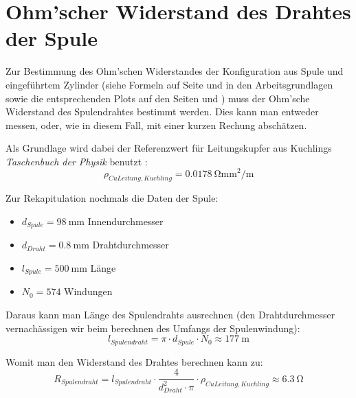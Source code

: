 \clearpage
\section{Ohm'scher Widerstand des Drahtes der Spule}
\label{app:R_Ohm_0}

Zur   Bestimmung   des   Ohm'schen    Widerstandes   der   Konfiguration   aus
Spule    und    eingef\"uhrtem    Zylinder   (siehe    Formeln    auf    Seite
\pageref{eq:hohlzylinder:LRExact}     und     \pageref{eq:vollzylinder:RExact}
in     den     Arbeitsgrundlagen     sowie    die     entsprechenden     Plots
auf     den     Seiten    \pageref{sec:ausw:subsec:vollz:subsubsec:LR}     und
\pageref{sec:ausw:subsec:hohlz:st:subsubsec:LR}) muss der  Ohm'sche Widerstand
des Spulendrahtes bestimmt werden. Dies kann man entweder messen, oder, wie in
diesem Fall, mit einer kurzen Rechung absch\"atzen.

Als Grundlage wird  dabei der Referenzwert f\"ur  Leitungskupfer aus Kuchlings
\emph{Taschenbuch der Physik} benutzt \cite{ref:kuchling:resistivityTable}:
\begin{equation*}
    \rho_{CuLeitung,Kuchling} = \SI{0.0178}{\ohm\milli\meter\squared\per\meter}
\end{equation*}

Zur Rekapitulation nochmals die Daten der Spule:
\begin{itemize}
   \item
       $d_{Spule} = \SI{98}{\milli\meter}$ Innendurchmesser
   \item
       $d_{Draht} = \SI{0.8}{\milli\meter}$ Drahtdurchmesser
   \item
       $l_{Spule} = \SI{500}{\milli\meter}$ L\"ange
   \item
       $N_0 = \num{574}$ Windungen
\end{itemize}

Daraus  kann man  L\"ange  des Spulendrahts  ausrechnen (den  Drahtdurchmesser
vernach\"assigen wir beim berechnen des Umfangs der Spulenwindung):
\begin{equation*}
    l_{Spulendraht} = \pi \cdot d_{Spule} \cdot N_0 \approx \SI{177}{\meter}
\end{equation*}

Womit man den Widerstand des Drahtes berechnen kann zu:
\begin{equation*}
    R_{Spulendraht} = l_{Spulendraht} \cdot \frac{4}{d_{Draht}^2 \cdot \pi} \cdot \rho_{CuLeitung,Kuchling} \approx \SI{6.3}{\ohm}
\end{equation*}

